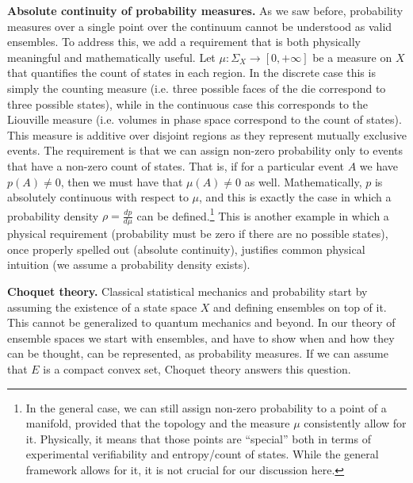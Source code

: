 \documentclass[10pt,twocolumn, nofootinbib]{revtex4-2}
\begin{document}
\textbf{Absolute continuity of probability measures.} As we saw before, probability measures over a single point over the continuum cannot be understood as valid ensembles. To address this, we add a requirement that is both physically meaningful and mathematically useful. Let $\mu : \Sigma_X \to [0, + \infty]$ be a measure on $X$ that quantifies the count of states in each region. In the discrete case this is simply the counting measure (i.e. three possible faces of the die correspond to three possible states), while in the continuous case this corresponds to the Liouville measure (i.e. volumes in phase space correspond to the count of states). This measure is additive over disjoint regions as they represent mutually exclusive events. The requirement is that we can assign non-zero probability only to events that have a non-zero count of states. That is, if for a particular event $A$ we have $p(A) \neq 0$, then we must have that $\mu(A) \neq 0$ as well. Mathematically, $p$ is absolutely continuous with respect to $\mu$, and this is exactly the case in which a probability density $\rho = \frac{dp}{d\mu}$ can be defined.\footnote{In the general case, we can still assign non-zero probability to a point of a manifold, provided that the topology and the measure $\mu$ consistently allow for it. Physically, it means that those points are ``special'' both in terms of experimental verifiability and entropy/count of states. While the general framework allows for it, it is not crucial for our discussion here.} This is another example in which a physical requirement (probability must be zero if there are no possible states), once properly spelled out (absolute continuity), justifies common physical intuition (we assume a probability density exists).

\textbf{Choquet theory.} Classical statistical mechanics and probability start by assuming the existence of a state space $X$ and defining ensembles on top of it. This cannot be generalized to quantum mechanics and beyond. In our theory of ensemble spaces we start with ensembles, and have to show when and how they can be thought, can be represented, as probability measures. If we can assume that $E$ is a compact convex set, Choquet theory answers this question.
\end{document}
